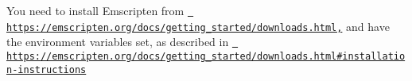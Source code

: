 
\begin{DoxyItemize}
\item You need to install Emscripten from \href{https://emscripten.org/docs/getting_started/downloads.html,}{\texttt{ https\+://emscripten.\+org/docs/getting\+\_\+started/downloads.\+html,}} and have the environment variables set, as described in \href{https://emscripten.org/docs/getting_started/downloads.html\#installation-instructions}{\texttt{ https\+://emscripten.\+org/docs/getting\+\_\+started/downloads.\+html\#installation-\/instructions}}
\end{DoxyItemize}


\begin{DoxyCode}{0}
\end{DoxyCode}
 